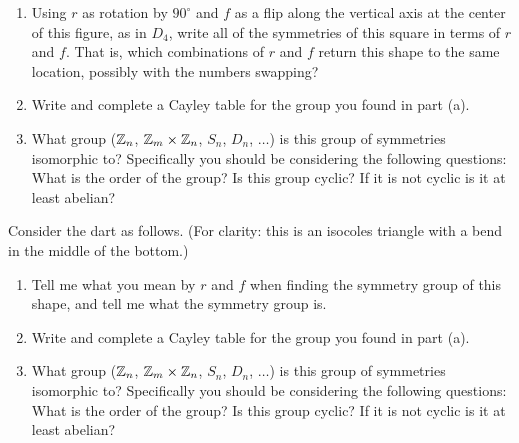 	\begin{enumerate}[label=(\alph*)]
		\item Using $r$ as rotation by $90^\circ$ and $f$ as a flip along the vertical axis at the center of this figure, as in $D_4$, write all of the symmetries of this square in terms of $r$ and $f$.  That is, which combinations of $r$ and $f$ return this shape to the same location, possibly with the numbers swapping?
		\vskip 2in
		\item Write and complete a Cayley table for the group you found in part (a).
		\vfill 
		\item What group ($\mathbb{Z}_n$, $\mathbb{Z}_m\times\mathbb{Z}_n$, $S_n$, $D_n$, $\dots$) is this group of symmetries isomorphic to? Specifically you should be considering the following questions: What is the order of the group? Is this group cyclic? If it is not cyclic is it at least abelian?
		\vskip 1in
	\end{enumerate}


Consider the dart as follows. (For clarity: this is an isocoles triangle with a bend in the middle of the bottom.)

	\begin{center}
	\end{center}
	
	\begin{enumerate}[label=(\alph*)]
		\item Tell me what you mean by $r$ and $f$ when finding the symmetry group of this shape, and tell me what the symmetry group is.
		\vskip 2in
		\item Write and complete a Cayley table for the group you found in part (a).
		\vfill 
		\item What group ($\mathbb{Z}_n$, $\mathbb{Z}_m\times\mathbb{Z}_n$, $S_n$, $D_n$, $\dots$) is this group of symmetries isomorphic to? Specifically you should be considering the following questions: What is the order of the group? Is this group cyclic? If it is not cyclic is it at least abelian?
		\vskip 1in
	\end{enumerate}